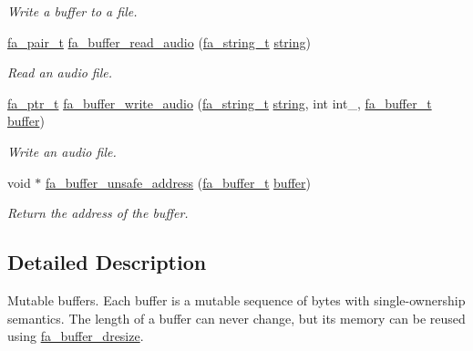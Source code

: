 \begin{DoxyCompactItemize}
\begin{DoxyCompactList}\small\item\em Write a buffer to a file. \end{DoxyCompactList}\item 
\hyperlink{group___fa_pair_gac2b2e58c230bac4f8a63ef6c05072680}{fa\-\_\-pair\-\_\-t} \hyperlink{group___fa_buffer_gadf31c6e905d0207931790f3468862940}{fa\-\_\-buffer\-\_\-read\-\_\-audio} (\hyperlink{group___fa_string_gacada63033b77bc6c39fa632ae199349b}{fa\-\_\-string\-\_\-t} \hyperlink{util_8h_a41106000aac73b61e4fc2ef9dd39a603}{string})
\begin{DoxyCompactList}\small\item\em Read an audio file. \end{DoxyCompactList}\item 
\hyperlink{group___fa_ga915ddeae99ad7568b273d2b876425197}{fa\-\_\-ptr\-\_\-t} \hyperlink{group___fa_buffer_ga51462ff7c74f09e7ea59d80895544558}{fa\-\_\-buffer\-\_\-write\-\_\-audio} (\hyperlink{group___fa_string_gacada63033b77bc6c39fa632ae199349b}{fa\-\_\-string\-\_\-t} \hyperlink{util_8h_a41106000aac73b61e4fc2ef9dd39a603}{string}, int int\-\_\-, \hyperlink{group___fa_buffer_ga0ed7a1d783ab322e2e8be02432d0839e}{fa\-\_\-buffer\-\_\-t} \hyperlink{util_8h_ad0c623e8b04565926f5b48888327724a}{buffer})
\begin{DoxyCompactList}\small\item\em Write an audio file. \end{DoxyCompactList}\item 
void $\ast$ \hyperlink{group___fa_buffer_gae70cd25a1633cea1ad12bc6080f3cd29}{fa\-\_\-buffer\-\_\-unsafe\-\_\-address} (\hyperlink{group___fa_buffer_ga0ed7a1d783ab322e2e8be02432d0839e}{fa\-\_\-buffer\-\_\-t} \hyperlink{util_8h_ad0c623e8b04565926f5b48888327724a}{buffer})
\begin{DoxyCompactList}\small\item\em Return the address of the buffer. \end{DoxyCompactList}\end{DoxyCompactItemize}


\subsection{Detailed Description}
Mutable buffers. Each buffer is a mutable sequence of bytes with single-\/ownership semantics. The length of a buffer can never change, but its memory can be reused using \hyperlink{group___fa_buffer_gab569f84162545bb4426a2d426ace8950}{fa\-\_\-buffer\-\_\-dresize}.

